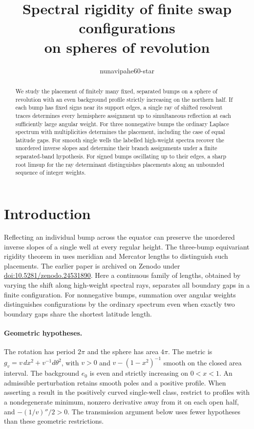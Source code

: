 \documentclass[11pt,letterpaper]{article}
\title{Spectral rigidity of finite swap configurations\\on spheres of revolution}
\author{nunavipahe60-star}
\date{}
\begin{document}
\maketitle
\begin{abstract}
We study the placement of finitely many fixed, separated bumps on a sphere of
revolution with an even background profile strictly increasing on the northern
half. If each bump has fixed signs near its support edges, a single ray of
shifted resolvent traces determines every hemisphere assignment up to
simultaneous reflection at each sufficiently large angular weight. For three
nonnegative bumps the ordinary Laplace spectrum with multiplicities
determines the placement, including the case of equal latitude gaps. For
smooth single wells the labelled high-weight spectra recover the unordered
inverse slopes and determine their branch assignments under a finite
separated-band hypothesis. For signed bumps oscillating up to their edges,
a sharp root limsup for the ray determinant distinguishes placements along
an unbounded sequence of integer weights.
\end{abstract}

\section*{Introduction}
Reflecting an individual bump across the equator can preserve the unordered
inverse slopes of a single well at every regular height. The three-bump
equivariant rigidity theorem in \cite[Corollary~10.3]{original}
uses meridian and Mercator lengths to distinguish such placements. The
earlier paper is archived on Zenodo under
\href{https://doi.org/10.5281/zenodo.24531890}{doi:10.5281/zenodo.24531890}.
Here a continuous family of lengths, obtained by varying the shift along
high-weight spectral rays, separates all boundary gaps in a finite
configuration. For nonnegative bumps, summation over angular weights
distinguishes configurations by the ordinary spectrum even when exactly
two boundary gaps share the shortest latitude length.

\paragraph{Geometric hypotheses.}
The rotation has period \(2\pi\) and the sphere has area \(4\pi\).
The metric is \(g_v=v\,dx^2+v^{-1}d\theta^2\), with \(v>0\) and
\(v-(1-x^2)^{-1}\) smooth on the closed area interval. The background
\(e_0\) is even and strictly increasing on \(0<x<1\).
An admissible perturbation retains smooth poles and a positive profile.
When asserting a result in the positively curved single-well class, restrict
to profiles with a nondegenerate minimum, nonzero derivative away from it
on each open half, and \(-(1/v)''/2>0\). The transmission argument below
uses fewer hypotheses than these geometric restrictions.
\end{document}
